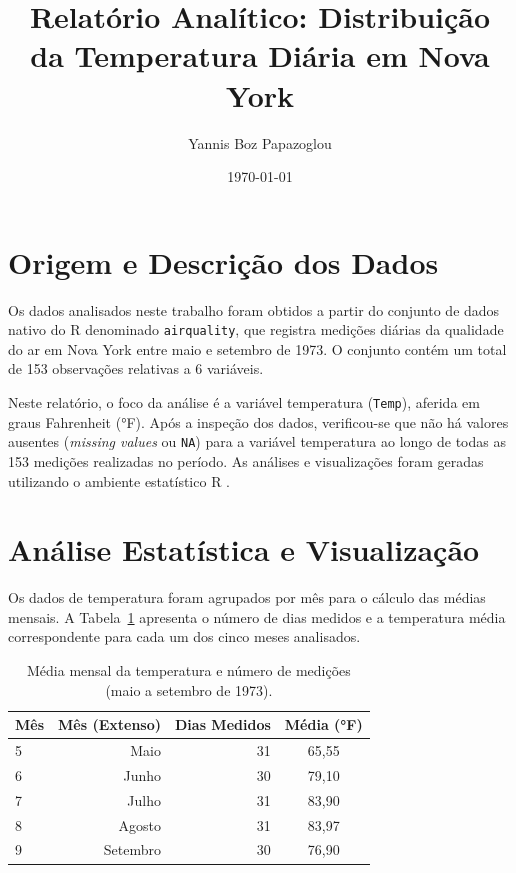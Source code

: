 \documentclass{article}
\title{Relatório Analítico: Distribuição da Temperatura Diária em Nova York}
\author{Yannis Boz Papazoglou}
\date{\today}
\begin{document}
\maketitle

\section{Origem e Descrição dos Dados}

Os dados analisados neste trabalho foram obtidos a partir do conjunto de dados nativo do R denominado \texttt{airquality}, que registra medições diárias da qualidade do ar em Nova York entre maio e setembro de 1973. O conjunto contém um total de 153 observações relativas a 6 variáveis.

Neste relatório, o foco da análise é a variável temperatura (\texttt{Temp}), aferida em graus Fahrenheit (°F). Após a inspeção dos dados, verificou-se que não há valores ausentes (\textit{missing values} ou \texttt{NA}) para a variável temperatura ao longo de todas as 153 medições realizadas no período. As análises e visualizações foram geradas utilizando o ambiente estatístico R \citep{Rstat}.

\section{Análise Estatística e Visualização}

Os dados de temperatura foram agrupados por mês para o cálculo das médias mensais. A Tabela~\ref{tab:resumo} apresenta o número de dias medidos e a temperatura média correspondente para cada um dos cinco meses analisados.

\begin{table}[htbp]
  \centering
  \caption{Média mensal da temperatura e número de medições (maio a setembro de 1973).}
  \label{tab:resumo}
  \begin{tabular}{lrrc}
    \toprule
    Mês & Mês (Extenso) & Dias Medidos & Média (°F) \\
    \midrule
    5 & Maio & 31 & 65,55 \\
    6 & Junho & 30 & 79,10 \\
    7 & Julho & 31 & 83,90 \\
    8 & Agosto & 31 & 83,97 \\
    9 & Setembro & 30 & 76,90 \\
    \bottomrule
  \end{tabular}
\end{table}
\end{document}
